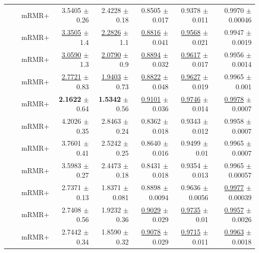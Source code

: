 \begin{longtable}{llp{}rrrrr}
 &  & mRMR+ & 3.5405 {\scriptsize $\pm$ 0.26} & 2.4228 {\scriptsize $\pm$ 0.18} & 0.8505 {\scriptsize $\pm$ 0.017} & 0.9378 {\scriptsize $\pm$ 0.011} & 0.9970 {\scriptsize $\pm$ 0.00046} \\
 &  & mRMR+ & \underline{3.3505} {\scriptsize $\pm$ 1.4} & \underline{2.2826} {\scriptsize $\pm$ 1.1} & \underline{0.8816} {\scriptsize $\pm$ 0.041} & \underline{0.9568} {\scriptsize $\pm$ 0.021} & 0.9947 {\scriptsize $\pm$ 0.0019} \\
 &  & mRMR+ & \underline{3.0590} {\scriptsize $\pm$ 1.3} & \underline{2.0790} {\scriptsize $\pm$ 0.9} & \underline{0.8894} {\scriptsize $\pm$ 0.032} & \underline{0.9617} {\scriptsize $\pm$ 0.017} & 0.9956 {\scriptsize $\pm$ 0.0014} \\
 &  & mRMR+ & \underline{2.7721} {\scriptsize $\pm$ 0.83} & \underline{1.9403} {\scriptsize $\pm$ 0.73} & \underline{0.8822} {\scriptsize $\pm$ 0.048} & \underline{0.9627} {\scriptsize $\pm$ 0.019} & 0.9965 {\scriptsize $\pm$ 0.001} \\
 &  & mRMR+ & \textbf{2.1622} {\scriptsize $\pm$ 0.64} & \textbf{1.5342} {\scriptsize $\pm$ 0.56} & \underline{0.9101} {\scriptsize $\pm$ 0.036} & \underline{0.9746} {\scriptsize $\pm$ 0.014} & \underline{0.9978} {\scriptsize $\pm$ 0.0007} \\
 &  & mRMR+ & 4.2026 {\scriptsize $\pm$ 0.35} & 2.8463 {\scriptsize $\pm$ 0.24} & 0.8362 {\scriptsize $\pm$ 0.018} & 0.9343 {\scriptsize $\pm$ 0.012} & 0.9958 {\scriptsize $\pm$ 0.0007} \\
 &  & mRMR+ & 3.7601 {\scriptsize $\pm$ 0.41} & 2.5242 {\scriptsize $\pm$ 0.25} & 0.8640 {\scriptsize $\pm$ 0.016} & 0.9499 {\scriptsize $\pm$ 0.01} & 0.9965 {\scriptsize $\pm$ 0.0007} \\
 &  & mRMR+ & 3.5983 {\scriptsize $\pm$ 0.27} & 2.4473 {\scriptsize $\pm$ 0.18} & 0.8431 {\scriptsize $\pm$ 0.018} & 0.9354 {\scriptsize $\pm$ 0.013} & 0.9965 {\scriptsize $\pm$ 0.00057} \\
 &  & mRMR+ & 2.7371 {\scriptsize $\pm$ 0.13} & 1.8371 {\scriptsize $\pm$ 0.081} & 0.8898 {\scriptsize $\pm$ 0.0094} & 0.9636 {\scriptsize $\pm$ 0.0056} & \underline{0.9977} {\scriptsize $\pm$ 0.00039} \\
 &  & mRMR+ & 2.7408 {\scriptsize $\pm$ 0.56} & 1.9232 {\scriptsize $\pm$ 0.36} & \underline{0.9029} {\scriptsize $\pm$ 0.029} & \underline{0.9735} {\scriptsize $\pm$ 0.01} & \underline{0.9957} {\scriptsize $\pm$ 0.0026} \\
 &  & mRMR+ & 2.7442 {\scriptsize $\pm$ 0.34} & 1.8590 {\scriptsize $\pm$ 0.32} & \underline{0.9078} {\scriptsize $\pm$ 0.029} & \underline{0.9715} {\scriptsize $\pm$ 0.011} & \underline{0.9963} {\scriptsize $\pm$ 0.0018} \\

\end{longtable}
